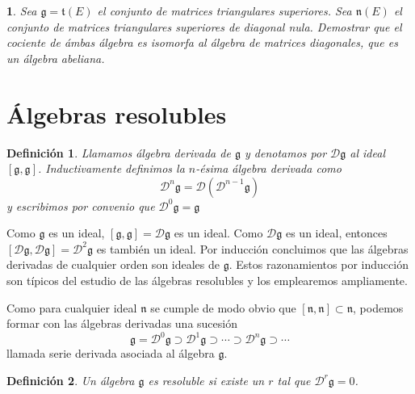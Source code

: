 \documentclass[a4paper,draft,12pt]{scrartcl}
\newtheorem{defi}{Definición}[section]%
\newtheorem{pro1}{}%
\newenvironment{pro}{\begin{pro1} \rm} {\end{pro1}}
\newcommand{\g}{\mathfrak{g}}%
\newcommand{\D}{\mathcal{D}}%
\newcommand{\df}[1]{\textsf{\color{blue}#1}}
\begin{document}
\begin{pro}

Sea $\g= \mathfrak{t}(E)$ el conjunto de matrices triangulares superiores.  Sea $\mathfrak{n}(E)$ el conjunto de matrices triangulares superiores de diagonal nula. Demostrar que el  cociente de ámbas álgebra es isomorfa al álgebra de matrices diagonales, que es un álgebra abeliana.

\end{pro}



\newpage
\section{Álgebras resolubles}

\begin{defi}

Llamamos  \df{álgebra derivada}  de $\g$ y denotamos por $\D \g$ al ideal $[\g,\g]$.  Inductivamente definimos la $n$-ésima álgebra derivada como 
$$
\D^n\g = \D(\D^{n-1}\g)
$$ 
y escribimos por convenio que $\D^0\g=\g$

\end{defi}

Como $\g$ es un ideal, $[\g,\g]= \D \g$ es un ideal.  Como $\D \g$ es un ideal, entonces $[\D\g,\D\g]= \D^2\g$ es también un ideal.  Por inducción concluimos que las álgebras derivadas de cualquier orden son ideales de $\g$.  Estos razonamientos por inducción son típicos del estudio de las álgebras resolubles y los emplearemos ampliamente.

Como para cualquier ideal $\mathfrak{n}$ se cumple de modo obvio que $[\mathfrak{n},\mathfrak{n}]\subset \mathfrak{n}$, podemos formar con las álgebras derivadas una sucesión
$$
\g = \D^0\g \supset \D^1 \g \supset \cdots \supset \D^n\g \supset \cdots
$$
llamada  \df{serie derivada}  asociada al álgebra $\g$.

\begin{defi}

Un álgebra $\g$ es  \df{resoluble}  si existe un $r$ tal que $\D^r \g=0$.

\end{defi}

\end{document}
